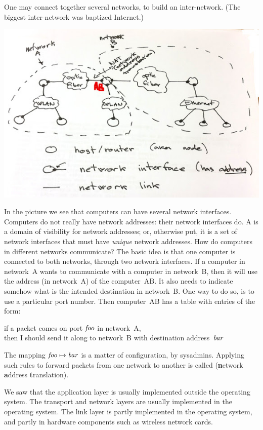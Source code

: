 One may connect together several networks, to build an inter-network.
(The biggest inter-network was baptized Internet.)
\begin{center}
\includegraphics[width=.9\textwidth]{internetwork.jpg}
\end{center}
In the picture we see that computers can have several network interfaces.
Computers do not really have network addresses: their network interfaces do.
A  is a domain of visibility for network addresses;
  or, otherwise put,
    it is a set of network interfaces that must have \emph{unique}
      network addresses.
How do computers in different networks communicate?
The basic idea is that one computer is connected to both networks,
  through two network interfaces.
If a computer in network~A wants to communicate with a computer in network~B,
  then it will use the address (in network~A) of the computer~AB.
It also needs to indicate somehow what is the intended destination in network~B\null.
One way to do so, is to use a particular port number.
Then computer~AB has a table with entries of the form:
\begin{center}
  if a packet comes on port $\it foo$ in network~A,\\
    then I should send it along to network~B with destination address~$\it bar$
\end{center}
The mapping ${\it foo}\mapsto{\it bar}$ is a matter of configuration,
  by sysadmins.
Applying such rules to forward packets from one network to another
  is called  ({\bf n}etwork {\bf a}ddress {\bf t}ranslation).

\smallskip

We saw that the application layer is usually implemented outside the operating system.
The transport and network layers are usually implemented in the operating system.
The link layer is partly implemented in the operating system,
  and partly in hardware components such as wireless network cards.

